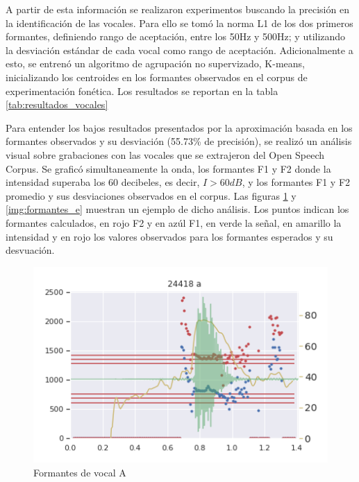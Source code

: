 

A partir de esta información se realizaron experimentos buscando la precisión en la identificación de las vocales. Para ello se tomó la norma L1 de los dos primeros formantes, definiendo rango de aceptación, entre los 50Hz y 500Hz; y utilizando la desviación estándar de cada vocal como rango de aceptación. Adicionalmente a esto, se entrenó un algoritmo de agrupación no supervizado, K-means, inicializando los centroides en los formantes observados en el corpus de experimentación fonética. Los resultados se reportan en la tabla \ref{tab:resultados_vocales}



Para entender los bajos resultados presentados por la aproximación basada en los formantes observados y su desviación (55.73\% de precisión), se realizó un análisis visual sobre grabaciones con las vocales que se extrajeron del Open Speech Corpus. Se graficó simultaneamente la onda, los formantes F1 y F2 donde la intensidad superaba los 60 decibeles, es decir, $I > 60 dB$, y los formantes F1 y F2 promedio y sus desviaciones observados en el corpus. Las figuras \ref{img:formantes_a} y \ref{img:formantes_e}  muestran un ejemplo de dicho análisis. Los puntos indican los formantes calculados, en rojo F2 y en azúl F1, en verde la señal, en amarillo la intensidad y en rojo los valores observados para los formantes esperados y su desvuación.




\begin{figure}[H]
\caption{Formantes de vocal A}
\label{img:formantes_a}
\includegraphics[width=\textwidth]{imagenes/04_02_a.png}
\end{figure}

